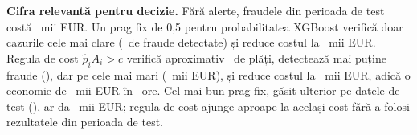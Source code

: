 %
{\textbf{Cifra relevantă pentru decizie.} Fără alerte, fraudele din perioada de test costă \NcostNone\ mii EUR. Un prag fix de 0,5 pentru probabilitatea XGBoost verifică doar cazurile cele mai clare (\NcaughtHalf\ de fraude detectate) și reduce costul la \NcostHalf\ mii EUR. Regula de cost $\hat p_i A_i>c$ verifică aproximativ \NalertsRule\ de plăți, detectează mai puține fraude (\NcaughtRule), dar pe cele mai mari (\NcaughtEurRule\ mii EUR), și reduce costul la \NcostRule\ mii EUR, adică o economie de \NsaveRule\ mii EUR în \NhoursTest\ ore.
Cel mai bun prag fix, găsit ulterior pe datele de test (\NbestFixedThr), ar da \NbestFixedCost\ mii EUR; regula de cost ajunge aproape la același cost fără a folosi rezultatele din perioada de test.}

